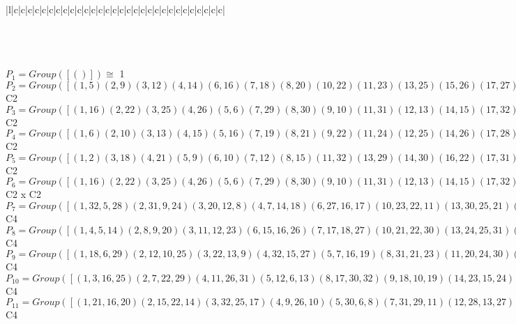 \documentclass[varwidth=\maxdimen,border=10]{standalone}
\begin{document}
\begin{tabular}
\begin{array}{|l|c|c|c|c|c|c|c|c|c|c|c|c|c|c|c|c|c|c|c|c|c|c|c|c|c|c|c|c|c|c|}
\end{array}\)\\
\ \\
\ \\
$P_{1} = Group( [ () ] )\cong$ 1\ \\
$P_{2} = Group( [ ( 1, 5)( 2, 9)( 3,12)( 4,14)( 6,16)( 7,18)( 8,20)(10,22)(11,23)(13,25)(15,26)(17,27)(19,29)(21,30)(24,31)(28,32) ] )\cong$ C2\ \\
$P_{3} = Group( [ ( 1,16)( 2,22)( 3,25)( 4,26)( 5, 6)( 7,29)( 8,30)( 9,10)(11,31)(12,13)(14,15)(17,32)(18,19)(20,21)(23,24)(27,28) ] )\cong$ C2\ \\
$P_{4} = Group( [ ( 1, 6)( 2,10)( 3,13)( 4,15)( 5,16)( 7,19)( 8,21)( 9,22)(11,24)(12,25)(14,26)(17,28)(18,29)(20,30)(23,31)(27,32) ] )\cong$ C2\ \\
$P_{5} = Group( [ ( 1, 2)( 3,18)( 4,21)( 5, 9)( 6,10)( 7,12)( 8,15)(11,32)(13,29)(14,30)(16,22)(17,31)(19,25)(20,26)(23,28)(24,27) ] )\cong$ C2\ \\
$P_{6} = Group( [ ( 1,16)( 2,22)( 3,25)( 4,26)( 5, 6)( 7,29)( 8,30)( 9,10)(11,31)(12,13)(14,15)(17,32)(18,19)(20,21)(23,24)(27,28), ( 1, 5)( 2, 9)( 3,12)( 4,14)( 6,16)( 7,18)( 8,20)(10,22)(11,23)(13,25)(15,26)(17,27)(19,29)(21,30)(24,31)(28,32) ] )\cong$ C2 x C2\ \\
$P_{7} = Group( [ ( 1,32, 5,28)( 2,31, 9,24)( 3,20,12, 8)( 4, 7,14,18)( 6,27,16,17)(10,23,22,11)(13,30,25,21)(15,19,26,29), ( 1, 5)( 2, 9)( 3,12)( 4,14)( 6,16)( 7,18)( 8,20)(10,22)(11,23)(13,25)(15,26)(17,27)(19,29)(21,30)(24,31)(28,32) ] )\cong$ C4\ \\
$P_{8} = Group( [ ( 1, 4, 5,14)( 2, 8, 9,20)( 3,11,12,23)( 6,15,16,26)( 7,17,18,27)(10,21,22,30)(13,24,25,31)(19,28,29,32), ( 1, 5)( 2, 9)( 3,12)( 4,14)( 6,16)( 7,18)( 8,20)(10,22)(11,23)(13,25)(15,26)(17,27)(19,29)(21,30)(24,31)(28,32) ] )\cong$ C4\ \\
$P_{9} = Group( [ ( 1,18, 6,29)( 2,12,10,25)( 3,22,13, 9)( 4,32,15,27)( 5, 7,16,19)( 8,31,21,23)(11,20,24,30)(14,28,26,17), ( 1, 6)( 2,10)( 3,13)( 4,15)( 5,16)( 7,19)( 8,21)( 9,22)(11,24)(12,25)(14,26)(17,28)(18,29)(20,30)(23,31)(27,32) ] )\cong$ C4\ \\
$P_{10} = Group( [ ( 1, 3,16,25)( 2, 7,22,29)( 4,11,26,31)( 5,12, 6,13)( 8,17,30,32)( 9,18,10,19)(14,23,15,24)(20,27,21,28), ( 1,16)( 2,22)( 3,25)( 4,26)( 5, 6)( 7,29)( 8,30)( 9,10)(11,31)(12,13)(14,15)(17,32)(18,19)(20,21)(23,24)(27,28) ] )\cong$ C4\ \\
$P_{11} = Group( [ ( 1,21,16,20)( 2,15,22,14)( 3,32,25,17)( 4, 9,26,10)( 5,30, 6, 8)( 7,31,29,11)(12,28,13,27)(18,24,19,23), ( 1,16)( 2,22)( 3,25)( 4,26)( 5, 6)( 7,29)( 8,30)( 9,10)(11,31)(12,13)(14,15)(17,32)(18,19)(20,21)(23,24)(27,28) ] )\cong$ C4\ \\

\end{tabular}
\end{document}
